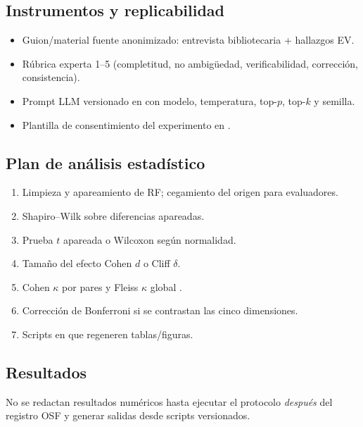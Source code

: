 \documentclass[12pt,journal,onecolumn]{IEEEtran}
\begin{document}
\subsection{Instrumentos y replicabilidad}
\begin{itemize}
\item Guion/material fuente anonimizado: entrevista bibliotecaria + hallazgos EV.
\item Rúbrica experta 1--5 (completitud, no ambigüedad, verificabilidad, corrección, consistencia).
\item Prompt LLM versionado en  con modelo, temperatura, top-$p$, top-$k$ y semilla.
\item Plantilla de consentimiento del experimento en .
\end{itemize}

\subsection{Plan de análisis estadístico}
\begin{enumerate}
\item Limpieza y apareamiento de RF; cegamiento del origen para evaluadores.
\item Shapiro--Wilk sobre diferencias apareadas.
\item Prueba $t$ apareada o Wilcoxon según normalidad.
\item Tamaño del efecto Cohen $d$ o Cliff $\delta$.
\item Cohen $\kappa$ por pares y Fleiss $\kappa$ global \cite{cohen1960kappa,fleiss1971kappa}.
\item Corrección de Bonferroni si se contrastan las cinco dimensiones.
\item Scripts en  que regeneren tablas/figuras.
\end{enumerate}

\subsection{Resultados}
No se redactan resultados numéricos hasta ejecutar el protocolo \emph{después} del registro OSF y generar salidas desde scripts versionados.
\end{document}
